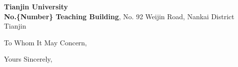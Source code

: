 \documentclass[12pt]{TJUletter}
\begin{document}
\begin{letter}{
		\textbf{Tianjin University}\\
		\textbf{No.\{Number\} Teaching Building}, No. 92 Weijin Road, Nankai District \\
		Tianjin 
	}

	\opening{To Whom It May Concern,}

    \lipsum[1-8]

	\closing{Yours Sincerely,}

\end{letter}
\end{document}
